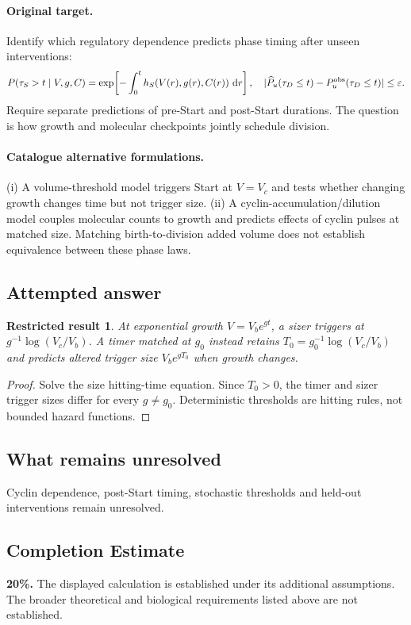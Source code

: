 \documentclass[11pt]{article}
\newcommand{\dd}{\,\mathrm d}
\newtheorem{attemptresult}{Restricted result}[section]
\begin{document}
\paragraph{Original target.}
Identify which regulatory dependence predicts phase timing after unseen interventions:
\[
P(\tau_S>t\mid V,g,C)=\exp\!\left[-\int_0^t h_S(V(r),g(r),C(r))\,\dd r\right],
\quad |\widehat P_u(\tau_D\leq t)-P_u^{\rm obs}(\tau_D\leq t)|\leq\varepsilon.
\]
Require separate predictions of pre-Start and post-Start durations. The question is how growth and molecular checkpoints jointly schedule division.
\paragraph{Catalogue alternative formulations.}
(i) A volume-threshold model triggers Start at $V=V_c$ and tests whether changing growth changes time but not trigger size. (ii) A cyclin-accumulation/dilution model couples molecular counts to growth and predicts effects of cyclin pulses at matched size. Matching birth-to-division added volume does not establish equivalence between these phase laws.
\subsection{Attempted answer}
\begin{attemptresult}
At exponential growth $V=V_be^{gt}$, a sizer triggers at $g^{-1}\log(V_c/V_b)$. A timer matched at $g_0$ instead retains $T_0=g_0^{-1}\log(V_c/V_b)$ and predicts altered trigger size $V_be^{gT_0}$ when growth changes.
\end{attemptresult}
\begin{proof}
Solve the size hitting-time equation. Since $T_0>0$, the timer and sizer trigger sizes differ for every $g\ne g_0$. Deterministic thresholds are hitting rules, not bounded hazard functions.
\end{proof}
\subsection{What remains unresolved}
Cyclin dependence, post-Start timing, stochastic thresholds and held-out interventions remain unresolved.
\subsection{Completion Estimate}
\textbf{20\%.} The displayed calculation is established under its additional assumptions. The broader theoretical and biological requirements listed above are not established.
\end{document}
